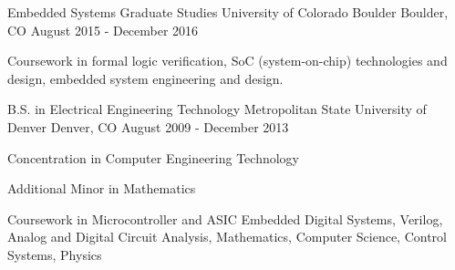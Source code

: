 

\begin{cventries}

  \cventry
    {Embedded Systems Graduate Studies} %
    {University of Colorado Boulder} %
    {Boulder, CO} %
    {August 2015 - December 2016} %
    {
      \begin{cvitems} %
		\item {Coursework in formal logic verification, SoC (system-on-chip) technologies and design, embedded system engineering and design.}
      \end{cvitems}
    }
  \cventry
    {B.S. in Electrical Engineering Technology} %
    {Metropolitan State University of Denver} %
    {Denver, CO} %
    {August 2009 - December 2013} %
    {
      \begin{cvitems} %
		\item {Concentration in Computer Engineering Technology}
		\item { Additional Minor in Mathematics }
		\item { Coursework in Microcontroller and ASIC Embedded Digital Systems, Verilog, Analog and Digital Circuit Analysis, Mathematics, Computer Science, Control Systems, Physics }
      \end{cvitems}
    }

\end{cventries}
